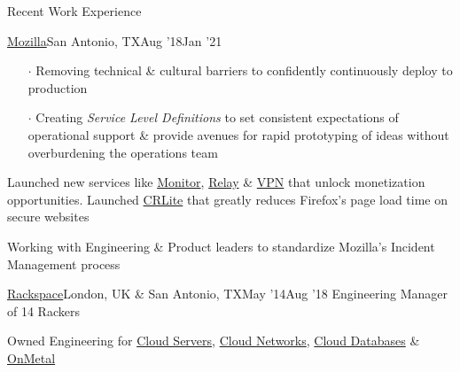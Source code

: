\documentclass{resume} %
\begin{document}
\begin{rSection}{Recent Work Experience}
\begin{rSubsection}{\href{https://www.mozilla.org/}{Mozilla}}{San Antonio, TX}{Aug '18}{Jan '21}
\begin{itemize}
  \item[$\cdot$] Removing technical \& cultural barriers to confidently continuously deploy to production
  \item[$\cdot$] Creating \textit{Service Level Definitions} to set consistent expectations of operational support \& provide avenues for rapid prototyping of ideas without overburdening the operations team
        \end{itemize}
  \item Launched new services like \href{https://monitor.firefox.com/}{Monitor}, \href{https://relay.firefox.com/}{Relay} \& \href{https://vpn.mozilla.org/}{VPN} that unlock monetization opportunities. Launched \href{https://blog.mozilla.org/security/2020/01/21/crlite-part-3-speeding-up-secure-browsing/}{CRLite} that greatly reduces Firefox's page load time on secure websites
  \item Working with Engineering \& Product leaders to standardize Mozilla's Incident Management process
\end{rSubsection}


\begin{rSubsection}{\href{https://www.rackspace.com/}{Rackspace}}{London, UK \& San Antonio, TX}{May '14}{Aug '18}
  {Engineering Manager of 14 Rackers}
  \item Owned Engineering for \href{https://www.rackspace.com/openstack/public/servers}{Cloud Servers}, \href{https://www.rackspace.com/openstack/public/networks}{Cloud Networks}, \href{https://www.rackspace.com/openstack/public/databases}{Cloud Databases} \& \href{https://www.rackspace.com/openstack/public/servers/onmetal}{OnMetal}



\end{rSubsection}
\end{rSection}
\end{document}

